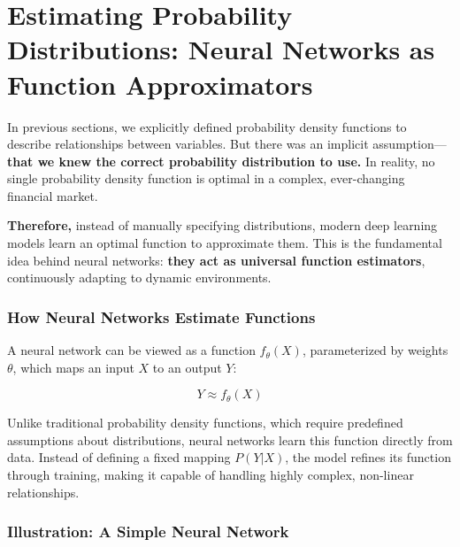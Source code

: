 
\section{Estimating Probability Distributions: Neural Networks as Function Approximators}

In previous sections, we explicitly defined probability density functions to describe relationships between variables. But there was an implicit assumption—\textbf{that we knew the correct probability distribution to use.} In reality, no single probability density function is optimal in a complex, ever-changing financial market.

\textbf{Therefore,} instead of manually specifying distributions, modern deep learning models learn an optimal function to approximate them. This is the fundamental idea behind neural networks: \textbf{they act as universal function estimators}, continuously adapting to dynamic environments.

\subsubsection*{How Neural Networks Estimate Functions}

A neural network can be viewed as a function \( f_\theta(X) \), parameterized by weights \( \theta \), which maps an input \( X \) to an output \( Y \):

\[
Y \approx f_\theta(X)
\]

Unlike traditional probability density functions, which require predefined assumptions about distributions, neural networks learn this function directly from data. Instead of defining a fixed mapping \( P(Y | X) \), the model refines its function through training, making it capable of handling highly complex, non-linear relationships.

\subsubsection*{Illustration: A Simple Neural Network}

\begin{center}
\end{center}

